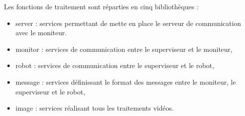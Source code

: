 Les fonctions de traitement sont réparties en cinq bibliothèques :
\begin{itemize}
	\item server : services permettant de mette en place le serveur de communication avec le moniteur.
	\item monitor : services de communication entre le superviseur et le moniteur,
	\item robot : services de communication entre le superviseur et le robot,
	\item message : services définissant le format des messages entre le moniteur, le superviseur et le robot,
	\item image : services réalisant tous les traitements vidéos.\\
\end{itemize}

